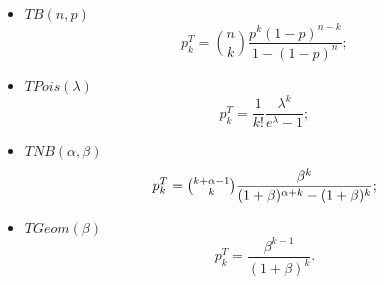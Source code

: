         \begin{itemize}
            \item $TB(n, p)$
            \begin{equation*}
                p_k^T = \binom{n}{k} \frac{p^k(1-p)^{n-k}}{1 - (1-p)^n};
            \end{equation*}
            \item $TPois(\lambda)$
            \begin{equation*}
                p^T_k = \frac{1}{k!} \frac{\lambda ^ k }{e^\lambda - 1};
            \end{equation*}
            \item $TNB(\alpha, \beta)$
            \begin{equation*}
                p_k^T = \tbinom{k + \alpha - 1}{k}\frac{\beta^{k}}{(1+\beta)^{\alpha+k} - (1+\beta)^k};
            \end{equation*}
            \item $TGeom(\beta)$
            \begin{equation*}
                p_k^T = \frac{\beta^{k - 1}}{(1 + \beta)^k}.
            \end{equation*}
        \end{itemize}